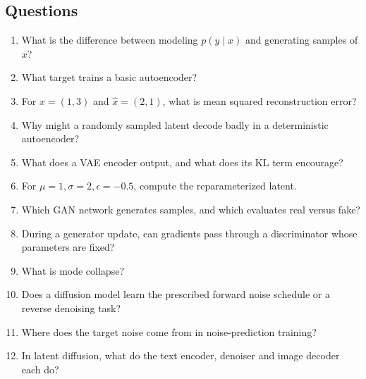 \documentclass[11pt]{article}
\begin{document}
\subsection{Questions}
\begin{enumerate}
\item What is the difference between modeling $p(y\mid x)$ and generating samples of $x$?
\item What target trains a basic autoencoder?
\item For $x=(1,3)$ and $\widehat{x}=(2,1)$, what is mean squared reconstruction error?
\item Why might a randomly sampled latent decode badly in a deterministic autoencoder?
\item What does a VAE encoder output, and what does its KL term encourage?
\item For $\mu=1,\sigma=2,\epsilon=-0.5$, compute the reparameterized latent.
\item Which GAN network generates samples, and which evaluates real versus fake?
\item During a generator update, can gradients pass through a discriminator whose parameters are fixed?
\item What is mode collapse?
\item Does a diffusion model learn the prescribed forward noise schedule or a reverse denoising task?
\item Where does the target noise come from in noise-prediction training?
\item In latent diffusion, what do the text encoder, denoiser and image decoder each do?
\end{enumerate}
\end{document}
